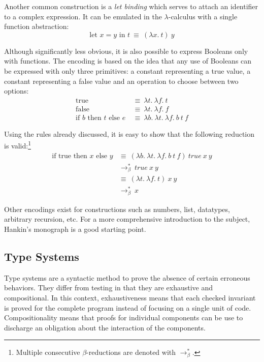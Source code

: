 Another common construction is a \emph{let binding} which serves to attach an identifier to a
complex expression. It can be emulated in the $\lambda$-calculus with a single function abstraction:
\begin{displaymath}
  \text{let } x = y \text{ in } t \: \equiv \: (\lambda x. \ t) \ y
\end{displaymath}

Although significantly less obvious, it is also possible to express Booleans only with functions.
The encoding is based on the idea that any use of Booleans can be expressed with only three
primitives: a constant representing a true value, a constant representing a false value and an
operation to choose between two options:
\begin{align*}
  \text{true}
    & \: \equiv \: \lambda t. \ \lambda f. \ t \\
  \text{false}
    & \: \equiv \: \lambda t. \ \lambda f. \ f \\
  \text{if } b \text{ then } t \text{ else } e
    & \: \equiv \: \lambda b. \ \lambda t. \ \lambda f. \ b \ t \ f
\end{align*}

Using the rules already discussed, it is easy to show that the following reduction is
valid:\footnote{Multiple consecutive $\beta$-reductions are denoted with $\to_\beta^*$.}
\begin{align*}
  \text{if true then } x \text{ else } y
    & \equiv \: (\lambda b. \ \lambda t. \ \lambda f. \ b \ t \ f) \ true \ x \ y \\
    & \to_\beta^* \: true \ x \ y \\
    & \equiv \: (\lambda t. \ \lambda f. \ t) \ x \ y \\
    & \to_\beta^* \: x
\end{align*}

Other encodings exist for constructions such as numbers, list, datatypes, arbitrary recursion, etc.
For a more comprehensive introduction to the subject, Hankin's monograph \cite{hankin-2004-ILCCS} is
a good starting point.

\subsection{Type Systems}

Type systems are a syntactic method to prove the absence of certain erroneous behaviors. They differ
from testing in that they are exhaustive and compositional. In this context, exhaustiveness means
that each checked invariant is proved for the complete program instead of focusing on a single unit
of code. Compositionality means that proofs for individual components can be use to discharge an
obligation about the interaction of the components.

